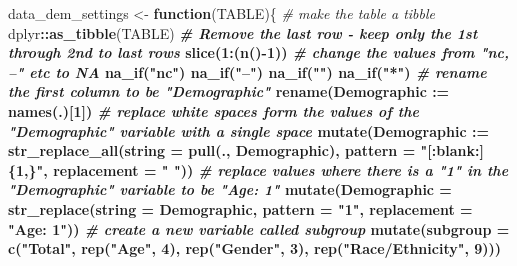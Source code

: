 \documentclass[
]{article}
\newenvironment{Shaded}{\begin{snugshade}}{\end{snugshade}}
\newcommand{\CommentTok}[1]{\textcolor[rgb]{0.56,0.35,0.01}{\textit{#1}}}
\newcommand{\ControlFlowTok}[1]{\textcolor[rgb]{0.13,0.29,0.53}{\textbf{#1}}}
\newcommand{\DataTypeTok}[1]{\textcolor[rgb]{0.13,0.29,0.53}{#1}}
\newcommand{\DecValTok}[1]{\textcolor[rgb]{0.00,0.00,0.81}{#1}}
\newcommand{\KeywordTok}[1]{\textcolor[rgb]{0.13,0.29,0.53}{\textbf{#1}}}
\newcommand{\NormalTok}[1]{#1}
\newcommand{\OperatorTok}[1]{\textcolor[rgb]{0.81,0.36,0.00}{\textbf{#1}}}
\newcommand{\StringTok}[1]{\textcolor[rgb]{0.31,0.60,0.02}{#1}}
\begin{document}
\begin{Shaded}
\begin{Highlighting}[]
\NormalTok{data_dem_settings <-}\StringTok{ }\ControlFlowTok{function}\NormalTok{(TABLE)\{}
  \CommentTok{# make the table a tibble}
\NormalTok{  dplyr}\OperatorTok{::}\KeywordTok{as_tibble}\NormalTok{(TABLE) }\OperatorTok{%>%}
\StringTok{  }\CommentTok{# Remove the last row - keep only the 1st through 2nd to last rows}
\StringTok{  }\KeywordTok{slice}\NormalTok{(}\DecValTok{1}\OperatorTok{:}\NormalTok{(}\KeywordTok{n}\NormalTok{()}\OperatorTok{-}\DecValTok{1}\NormalTok{)) }\OperatorTok{%>%}
\StringTok{  }\CommentTok{# change the values from "nc, --" etc to NA}
\StringTok{  }\KeywordTok{na_if}\NormalTok{(}\StringTok{"nc"}\NormalTok{) }\OperatorTok{%>%}
\StringTok{  }\KeywordTok{na_if}\NormalTok{(}\StringTok{"--"}\NormalTok{) }\OperatorTok{%>%}
\StringTok{  }\KeywordTok{na_if}\NormalTok{(}\StringTok{""}\NormalTok{) }\OperatorTok{%>%}
\StringTok{  }\KeywordTok{na_if}\NormalTok{(}\StringTok{"*"}\NormalTok{) }\OperatorTok{%>%}
\StringTok{  }\CommentTok{# rename the first column to be "Demographic"}
\StringTok{  }\KeywordTok{rename}\NormalTok{(}\DataTypeTok{Demographic :=} \KeywordTok{names}\NormalTok{(.)[}\DecValTok{1}\NormalTok{]) }\OperatorTok{%>%}
\StringTok{  }\CommentTok{# replace white spaces form the values of the "Demographic" variable with a single space}
\StringTok{  }\KeywordTok{mutate}\NormalTok{(}\DataTypeTok{Demographic :=} \KeywordTok{str_replace_all}\NormalTok{(}\DataTypeTok{string =} \KeywordTok{pull}\NormalTok{(., Demographic),}
                                        \DataTypeTok{pattern =} \StringTok{"[:blank:]\{1,\}"}\NormalTok{, }
                                        \DataTypeTok{replacement =} \StringTok{" "}\NormalTok{)) }\OperatorTok{%>%}
\StringTok{  }\CommentTok{# replace values where there is a "1" in the "Demographic" variable to be "Age: 1"}
\StringTok{  }\KeywordTok{mutate}\NormalTok{(}\DataTypeTok{Demographic =} \KeywordTok{str_replace}\NormalTok{(}\DataTypeTok{string =}\NormalTok{ Demographic, }
                                   \DataTypeTok{pattern =} \StringTok{"1"}\NormalTok{, }
                                   \DataTypeTok{replacement =} \StringTok{"Age: 1"}\NormalTok{)) }\OperatorTok{%>%}
\StringTok{  }\CommentTok{# create a new variable called subgroup}
\StringTok{  }\KeywordTok{mutate}\NormalTok{(}\DataTypeTok{subgroup =} \KeywordTok{c}\NormalTok{(}\StringTok{"Total"}\NormalTok{, }\KeywordTok{rep}\NormalTok{(}\StringTok{"Age"}\NormalTok{, }\DecValTok{4}\NormalTok{), }
                    \KeywordTok{rep}\NormalTok{(}\StringTok{"Gender"}\NormalTok{, }\DecValTok{3}\NormalTok{), }\KeywordTok{rep}\NormalTok{(}\StringTok{"Race/Ethnicity"}\NormalTok{, }\DecValTok{9}\NormalTok{))) }\OperatorTok{%>%}
}}}}}}}}}}
\end{Highlighting}
\end{Shaded}
\end{document}
